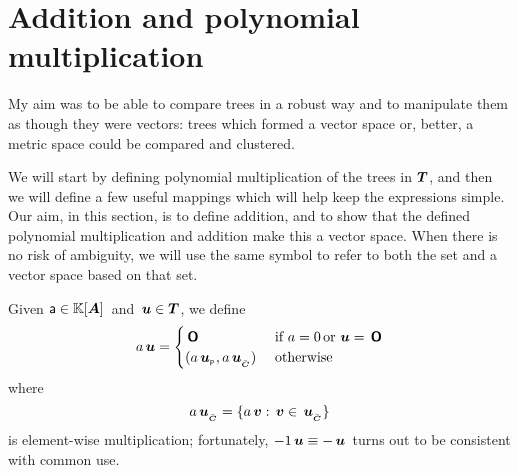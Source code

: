 


\section{Addition and polynomial multiplication}

My aim was to be able to compare trees in a robust way and to
manipulate them as though they were vectors: trees which formed a
vector space or, better, a metric space could be compared and
clustered. 

We will start by defining polynomial multiplication of the trees in
$\boldsymbol{T}$, and then we will define a few useful mappings which will help
keep the expressions simple. Our aim, in this section, is to define
addition, and to show that the defined polynomial multiplication and
addition make this a vector space. When there is no risk of ambiguity,
we will use the same symbol to refer to both the set and a vector
space based on that set.

\begin{definition}\label{polynomialmultiplication}
  Given $\mathsf{a} \in \mathbb{K}[{\boldsymbol{A}}]$\ and $\,\boldsymbol{u} \in \boldsymbol{T}$, we
  define
  \begin{align*}
    a \,\boldsymbol{u} = \begin{cases}
      \,\boldsymbol{\mathsf{O}}  & \text{ if } a = 0 \operatorname{\text{or}} \,\boldsymbol{u} = \,\boldsymbol{\mathsf{O}} \\
      (a {\,\boldsymbol{u}}_{{}_{\mathsf{P}}}, a{\,\boldsymbol{u}}_{{}_{\bar{\boldsymbol{C}}}}) & \text{ otherwise }
    \end{cases}
  \end{align*}
  where \[a{\,\boldsymbol{u}}_{{}_{\bar{\boldsymbol{C}}}} = \{a \,\boldsymbol{v}: \,\boldsymbol{v}\in{\,\boldsymbol{u}}_{{}_{\bar{\boldsymbol{C}}}}\}\] is
  element-wise multiplication; fortunately,  $-1 \,\boldsymbol{u} \equiv
  -\,\boldsymbol{u}$\ turns out to be consistent with common use.
\end{definition}

